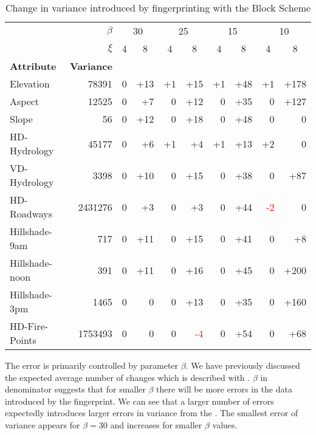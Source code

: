 \begin{table}[ht]
\centering
\caption{Change in variance introduced by fingerprinting with the Block Scheme}
\label{table:block-var}
\begin{tabular}{|l r|r r|r r|r r|r r|} 
 \hline
 & $\beta$ & \multicolumn{2}{c|}{30} & \multicolumn{2}{c|}{25} & \multicolumn{2}{c|}{15} & \multicolumn{2}{c|}{10} \\ 
 & $\xi$ & \multicolumn{1}{c}{4}&\multicolumn{1}{c|}{8}&\multicolumn{1}{c}{4}&\multicolumn{1}{c|}{8}&\multicolumn{1}{c}{4}&\multicolumn{1}{c|}{8}&\multicolumn{1}{c}{4}&\multicolumn{1}{c|}{8}\\
 \textbf{Attribute} & \textbf{Variance} & & & & & & & & \\
 \hline
 Elevation & 78391 & 0 & +13 & +1 & +15 & +1 & +48 & +1 & +178 \\
 \hline
 Aspect & 12525 & 0 & +7 & 0 & +12 & 0 & +35 & 0 & +127 \\
 \hline
 Slope & 56 & 0 & +12 & 0 & +18 & 0 & +48 & 0 & 0 \\
 \hline
 HD-Hydrology & 45177 & 0 & +6 & +1 & +4 & +1 & +13 & +2 & 0 \\
 \hline
 VD-Hydrology & 3398 & 0 & +10 & 0 & +15 & 0 & +38 & 0 & +87 \\
 \hline
 HD-Roadways & 2431276 & 0 & +3 & 0 & +3 & 0 & +44 & \textcolor{red}{-2} & 0 \\
 \hline
 Hillshade-9am & 717 & 0 & +11 & 0 & +15 & 0 & +41 & 0 & +8 \\
 \hline
 Hillshade-noon & 391 & 0 & +11 & 0 & +16 & 0 & +45 & 0 & +200 \\
 \hline
 Hillshade-3pm & 1465 & 0 & 0 & 0 & +13 & 0 & +35 & 0 & +160 \\
 \hline
 HD-Fire-Points & 1753493 & 0 & 0 & 0 & \textcolor{red}{-4} & 0 & +54 & 0 & +68 \\
 \hline
\end{tabular}
\end{table}

The error is primarily controlled by parameter $\beta$. 
We have previously discussed the expected average number of changes which is described with . 
$\beta$ in denominator suggests that for smaller $\beta$ there will be more errors in the data introduced by the fingerprint. 
We can see that a larger number of errors expectedly introduces larger errors in variance from the .
The smallest error of variance appears for $\beta=30$ and increases for smaller $\beta$ values.

